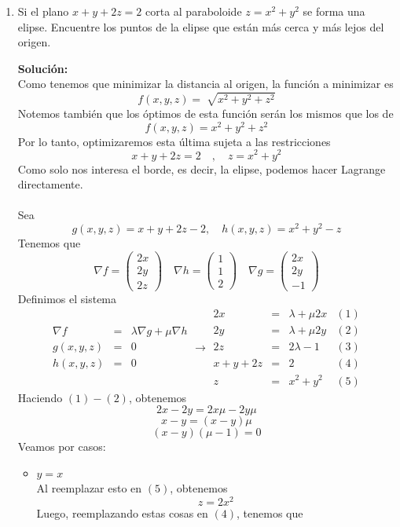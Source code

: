 \documentclass[12pt]{article}
\newenvironment{solucion}
{\begin{mdframed}[backgroundcolor=black!10]
		{\bf Solución:}\\
	}
	{
	\end{mdframed}
}
\newenvironment{preguntas}
{\begin{enumerate}\itemsep12pt
	}
	{
	\end{enumerate}
}
\newcommand{\ra}{\rightarrow}
\begin{document}
\begin{preguntas}
\begin{solucion}
\end{solucion}
\item Si el plano $x+y+2z=2$ corta al paraboloide $z=x^2+y^2$ se forma una elipse. Encuentre los puntos de la elipse que están más cerca y más lejos del origen.
\begin{solucion}
Como tenemos que minimizar la distancia al origen, la función a minimizar es
$$f(x,y,z) = \sqrt[]{x^2+y^2+z^2}$$
Notemos también que los óptimos de esta función serán los mismos que los de
$$f(x,y,z) = x^2 + y^2 + z^2$$
Por lo tanto, optimizaremos esta última sujeta a las restricciones
$$x+y+2z=2 \quad, \quad z=x^2+y^2$$
Como solo nos interesa el borde, es decir, la elipse, podemos hacer Lagrange directamente.\\
\\
Sea
$$g(x,y,z) = x+y+2z - 2, \quad h(x,y,z) = x^2+y^2 - z$$
Tenemos que
$$\nabla f = \begin{pmatrix} 2x \\ 2y \\ 2z \end{pmatrix} 
\quad 
\nabla h = \begin{pmatrix} 1 \\ 1 \\ 2 \end{pmatrix}
\quad 
\nabla g = \begin{pmatrix} 2x \\ 2y \\ -1 \end{pmatrix}$$
Definimos el sistema
$$\begin{array}{rcl} \nabla f & = & \lambda \nabla g + \mu \nabla h \\
g(x,y,z) & = & 0 \\
h(x,y,z) & = & 0 \end{array}
\ra 
\begin{array}{rcll}
2x & = & \lambda + \mu 2x & (1)\\
2y & = & \lambda + \mu 2y & (2)\\
2z & = & 2\lambda - 1 & (3)\\
x+y+2z & = & 2 & (4)\\
z & = & x^2+y^2 & (5)
\end{array}$$
Haciendo $(1) - (2)$, obtenemos
$$2x-2y = 2x\mu - 2y \mu$$
$$x-y = (x-y)\mu$$
$$(x-y)(\mu-1) = 0$$
Veamos por casos:
\begin{itemize}
\item $y = x$\\
	Al reemplazar esto en $(5)$, obtenemos
	$$z = 2x^2$$
	Luego, reemplazando estas cosas en $(4)$, tenemos que

\end{itemize}
\end{solucion}
\end{preguntas}
\end{document}
